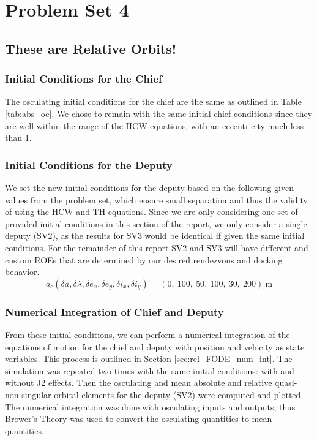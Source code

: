 \section{Problem Set 4}
\subsection{These are Relative Orbits!}

\subsubsection{Initial Conditions for the Chief} 
The osculating initial conditions for the chief are the same as outlined in Table \ref{tab:abs_oe}. We chose to remain with the same initial chief conditions since they are well within the range of the HCW equations, with an eccentricity much less than 1. 

\subsubsection{Initial Conditions for the Deputy} \label{sec:ic_for_pset4}

We set the new initial conditions for the deputy based on the following given values from the problem set, which ensure small separation and thus the validity of using the HCW and TH equations. Since we are only considering one set of provided initial conditions in this section of the report, we only consider a single deputy (SV2), as the results for SV3 would be identical if given the same initial conditions. For the remainder of this report SV2 and SV3 will have different and custom ROEs that are determined by our desired rendezvous and docking behavior. 
\[
a_c (\delta a, \delta \lambda, \delta e_x, \delta e_y, \delta i_x, \delta i_y) = (0,\ 100,\ 50,\ 100,\ 30,\ 200)~\text{m}
\]

\subsubsection{Numerical Integration of Chief and Deputy}
From these initial conditions, we can perform a numerical integration of the equations of motion for the chief and deputy with position and velocity as state variables. This process is outlined in Section \ref{sec:rel_FODE_num_int}. The simulation was repeated two times with the same initial conditions: with and without J2 effects. Then the osculating and mean absolute and relative quasi-non-singular orbital elements for the deputy (SV2) were computed and plotted. The numerical integration was done with osculating inputs and outputs, thus Brower's Theory was used to convert the osculating quantities to mean quantities. 

